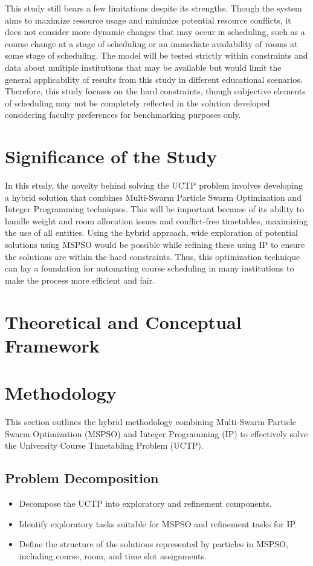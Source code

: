 \documentclass{article}
\begin{document}
This study still bears a few limitations despite its strengths. Though the system aims to maximize resource usage and minimize potential resource conflicts, it does not consider more dynamic changes that may occur in scheduling, such as a course change at a stage of scheduling or an immediate availability of rooms at some stage of scheduling. The model will be tested strictly within constraints and data about multiple institutions that may be available but would limit the general applicability of results from this study in different educational scenarios. Therefore, this study focuses on the hard constraints, though subjective elements of scheduling may not be completely reflected in the solution developed considering faculty preferences for benchmarking purposes only.


\section{Significance of the Study}
\label{sec:significance}

In this study, the novelty behind solving the UCTP problem involves developing a hybrid solution that combines Multi-Swarm Particle Swarm Optimization and Integer Programming techniques. This will be important because of its ability to handle weight and room allocation issues and conflict-free timetables, maximizing the use of all entities. Using the hybrid approach, wide exploration of potential solutions using MSPSO would be possible while refining these using IP to ensure the solutions are within the hard constraints. Thus, this optimization technique can lay a foundation for automating course scheduling in many institutions to make the process more efficient and fair. 

\section{Theoretical and Conceptual Framework}
\label{sec:theoreticalframework}

\section{Methodology}
\label{sec
}

This section outlines the hybrid methodology combining Multi-Swarm Particle Swarm Optimization (MSPSO) and Integer Programming (IP) to effectively solve the University Course Timetabling Problem (UCTP).

\subsection{Problem Decomposition}
\label{subsec
} \begin{itemize} \item Decompose the UCTP into exploratory and refinement components. \item Identify exploratory tasks suitable for MSPSO and refinement tasks for IP. \item Define the structure of the solutions represented by particles in MSPSO, including course, room, and time slot assignments. \end{itemize}
\end{document}
